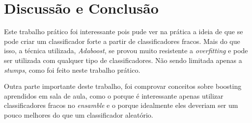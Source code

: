 \section{Discussão e Conclusão}
Este trabalho prático foi interessante pois pude ver na prática a ideia de que se pode criar um classificador forte a partir de classificadores fracos. Mais do que isso, a técnica utilizada, \emph{Adaboost}, se provou muito resistente a  \emph{overfitting} e pode ser utilizada com qualquer tipo de classificadores. Não sendo limitada apenas a \emph{stumps}, como foi feito neste trabalho prático. 

Outra parte importante deste trabalho, foi comprovar conceitos sobre boosting aprendidos em sala de aula, como o porque é interessante apenas utilizar classificadores fracos no \emph{ensamble} e o porque idealmente eles deveriam ser um pouco melhores do que um classificador aleatório.
